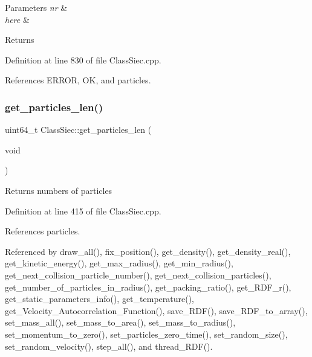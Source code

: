 \begin{DoxyParams}{Parameters}
{\em nr} & \\
\hline
{\em here} & \\
\hline
\end{DoxyParams}
\begin{DoxyReturn}{Returns}

\end{DoxyReturn}


Definition at line 830 of file Class\+Siec.\+cpp.



References E\+R\+R\+OR, OK, and particles.

\mbox{\label{classClassSiec_a5fa315d36ce3648e5e5c2bf66b744e18}} 
\subsubsection{\texorpdfstring{get\+\_\+particles\+\_\+len()}{get\_particles\_len()}}
{\footnotesize\ttfamily uint64\+\_\+t Class\+Siec\+::get\+\_\+particles\+\_\+len (\begin{DoxyParamCaption}\item[{void}]{ }\end{DoxyParamCaption})}

\begin{DoxyReturn}{Returns}
numbers of particles 
\end{DoxyReturn}


Definition at line 415 of file Class\+Siec.\+cpp.



References particles.



Referenced by draw\+\_\+all(), fix\+\_\+position(), get\+\_\+density(), get\+\_\+density\+\_\+real(), get\+\_\+kinetic\+\_\+energy(), get\+\_\+max\+\_\+radius(), get\+\_\+min\+\_\+radius(), get\+\_\+next\+\_\+collision\+\_\+particle\+\_\+number(), get\+\_\+next\+\_\+collision\+\_\+particles(), get\+\_\+number\+\_\+of\+\_\+particles\+\_\+in\+\_\+radius(), get\+\_\+packing\+\_\+ratio(), get\+\_\+\+R\+D\+F\+\_\+r(), get\+\_\+static\+\_\+parameters\+\_\+info(), get\+\_\+temperature(), get\+\_\+\+Velocity\+\_\+\+Autocorrelation\+\_\+\+Function(), save\+\_\+\+R\+D\+F(), save\+\_\+\+R\+D\+F\+\_\+to\+\_\+array(), set\+\_\+mass\+\_\+all(), set\+\_\+mass\+\_\+to\+\_\+area(), set\+\_\+mass\+\_\+to\+\_\+radius(), set\+\_\+momentum\+\_\+to\+\_\+zero(), set\+\_\+particles\+\_\+zero\+\_\+time(), set\+\_\+random\+\_\+size(), set\+\_\+random\+\_\+velocity(), step\+\_\+all(), and thread\+\_\+\+R\+D\+F().

